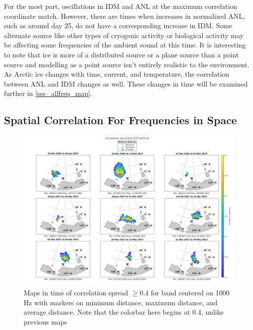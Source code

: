 For the most part, oscillations in IDM and ANL at the maximum correlation coordinate match. However, there are times when increases in normalized ANL, such as around day 25, do not have a corresponding increase in IDM. Some alternate source like other types of cryogenic activity \parencite{collins2019acoustic} or biological activity may be affecting some frequencies of the ambient sound at this time. It is interesting to note that ice is more of a distributed source or a plane source than a point source and modelling as a point source isn't entirely realistic to the environment. As Arctic ice changes with time, current, and temperature, the correlation between ANL and IDM changes as well. These changes in time will be examined further in \autoref{sec_allfreq_map}.



\subsection{Spatial Correlation For Frequencies in Space}  \label{sec_allfreq_map}
 
\begin{figure}[p]
\centering
\includegraphics[scale=0.24]{Figures/megamap_noisland_0.4_1000.jpg}
\caption{Maps in time of correlation spread $\geq 0.4$ for band centered on 1000 Hz with markers on minimum distance, maximum distance, and average distance. Note that the colorbar here begins at 0.4, unlike previous maps}
\label{fig_megamap}
\end{figure}

